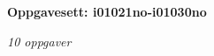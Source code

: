 \centerline{\bf Oppgavesett: i01021no-i01030no}
\vskip 10pt
\centerline{\it 10 oppgaver}\vskip 10pt
\vskip 10pt
